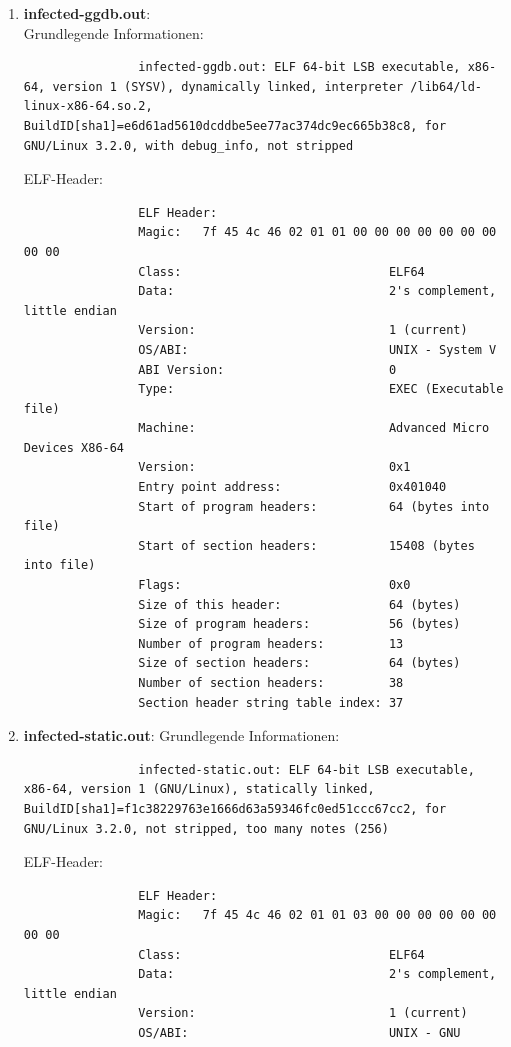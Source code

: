 \documentclass{article}
\begin{document}
\begin{enumerate}
\begin{enumerate}
			\item \textbf{infected-ggdb.out}:\\
			Grundlegende Informationen:\\
			\begin{lstlisting}
				infected-ggdb.out: ELF 64-bit LSB executable, x86-64, version 1 (SYSV), dynamically linked, interpreter /lib64/ld-linux-x86-64.so.2, BuildID[sha1]=e6d61ad5610dcddbe5ee77ac374dc9ec665b38c8, for GNU/Linux 3.2.0, with debug_info, not stripped
			\end{lstlisting}
			ELF-Header:\\
			\begin{lstlisting}
				ELF Header:
				Magic:   7f 45 4c 46 02 01 01 00 00 00 00 00 00 00 00 00
				Class:                             ELF64
				Data:                              2's complement, little endian
				Version:                           1 (current)
				OS/ABI:                            UNIX - System V
				ABI Version:                       0
				Type:                              EXEC (Executable file)
				Machine:                           Advanced Micro Devices X86-64
				Version:                           0x1
				Entry point address:               0x401040
				Start of program headers:          64 (bytes into file)
				Start of section headers:          15408 (bytes into file)
				Flags:                             0x0
				Size of this header:               64 (bytes)
				Size of program headers:           56 (bytes)
				Number of program headers:         13
				Size of section headers:           64 (bytes)
				Number of section headers:         38
				Section header string table index: 37
			\end{lstlisting}
			\item \textbf{infected-static.out}:
			Grundlegende Informationen:\\
			\begin{lstlisting}
				infected-static.out: ELF 64-bit LSB executable, x86-64, version 1 (GNU/Linux), statically linked, BuildID[sha1]=f1c38229763e1666d63a59346fc0ed51ccc67cc2, for GNU/Linux 3.2.0, not stripped, too many notes (256)
			\end{lstlisting}
			ELF-Header:\\
			\begin{lstlisting}
				ELF Header:
				Magic:   7f 45 4c 46 02 01 01 03 00 00 00 00 00 00 00 00
				Class:                             ELF64
				Data:                              2's complement, little endian
				Version:                           1 (current)
				OS/ABI:                            UNIX - GNU

\end{lstlisting}
\end{enumerate}
\end{enumerate}
\end{document}
